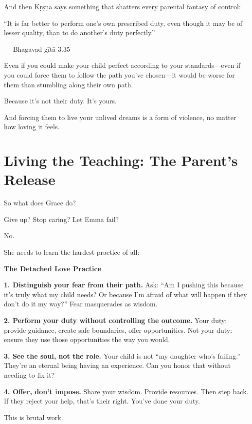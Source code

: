 \documentclass[11pt,twoside]{book}
\begin{document}
And then Kṛṣṇa says something that shatters every parental fantasy of control:

\begin{pullquote}
``It is far better to perform one's own prescribed duty, even though it may be of lesser quality, than to do another's duty perfectly.''

--- Bhagavad-gītā 3.35
\end{pullquote}

Even if you could make your child perfect according to your standards—even if you could force them to follow the path you've chosen—it would be worse for them than stumbling along their own path.

Because it's not their duty. It's yours.

And forcing them to live your unlived dreams is a form of violence, no matter how loving it feels.

\section*{Living the Teaching: The Parent's Release}

So what does Grace do?

Give up? Stop caring? Let Emma fail?

No.

She needs to learn the hardest practice of all:

\begin{practicebox}
\textbf{The Detached Love Practice}

\textbf{1. Distinguish your fear from their path.}
Ask: ``Am I pushing this because it's truly what my child needs? Or because I'm afraid of what will happen if they don't do it my way?'' Fear masquerades as wisdom.

\textbf{2. Perform your duty without controlling the outcome.}
Your duty: provide guidance, create safe boundaries, offer opportunities. Not your duty: ensure they use those opportunities the way you would.

\textbf{3. See the soul, not the role.}
Your child is not ``my daughter who's failing.'' They're an eternal being having an experience. Can you honor that without needing to fix it?

\textbf{4. Offer, don't impose.}
Share your wisdom. Provide resources. Then step back. If they reject your help, that's their right. You've done your duty.
\end{practicebox}

This is brutal work.
\end{document}
